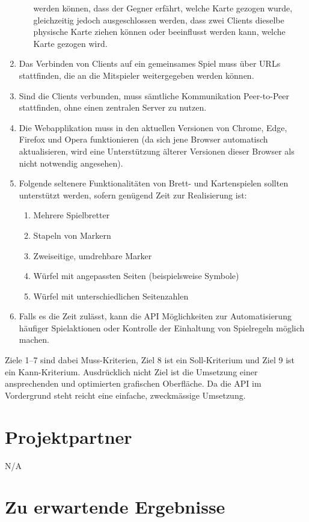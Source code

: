 \begin{enumerate}
\begin{enumerate}
    werden können, dass der Gegner erfährt, welche Karte gezogen wurde,
    gleichzeitig jedoch ausgeschlossen werden, dass zwei Clients dieselbe
    physische Karte ziehen können oder beeinflusst werden kann, welche Karte
    gezogen wird.
  \end{enumerate}
  \item Das Verbinden von Clients auf ein gemeinsames Spiel muss über URLs
  stattfinden, die an die Mitspieler weitergegeben werden können.
  \item Sind die Clients verbunden, muss sämtliche Kommunikation Peer-to-Peer
  stattfinden, ohne einen zentralen Server zu nutzen.
  \item Die Webapplikation muss in den aktuellen Versionen von Chrome, Edge,
  Firefox und Opera funktionieren (da sich jene Browser automatisch
  aktualisieren, wird eine Unterstützung älterer Versionen dieser Browser als
  nicht notwendig angesehen).
  \item Folgende seltenere Funktionalitäten von Brett- und Kartenspielen sollten
  unterstützt werden, sofern genügend Zeit zur Realisierung ist:
  \begin{enumerate}
    \item Mehrere Spielbretter
    \item Stapeln von Markern
    \item Zweiseitige, umdrehbare Marker
    \item Würfel mit angepassten Seiten (beispielsweise Symbole)
    \item Würfel mit unterschiedlichen Seitenzahlen
  \end{enumerate}
  \item Falls es die Zeit zulässt, kann die API Möglichkeiten zur
  Automatisierung häufiger Spielaktionen oder Kontrolle der Einhaltung von
  Spielregeln möglich machen.
\end{enumerate}

Ziele 1–7 sind dabei Muss-Kriterien, Ziel 8 ist ein Soll-Kriterium und Ziel 9
ist ein Kann-Kriterium. Ausdrücklich nicht Ziel ist die Umsetzung einer
ansprechenden und optimierten grafischen Oberfläche. Da die API im Vordergrund
steht reicht eine einfache, zweckmässige Umsetzung.

\section{Projektpartner}

N/A

\section{Zu erwartende Ergebnisse}

